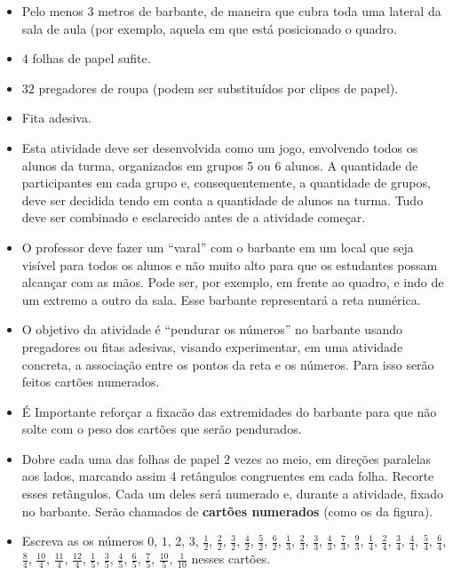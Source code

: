 \documentclass[oneside]{book}
\begin{document}
\begin{multicols}{2}
\begin{itemize} %
  \item     Pelo menos     $3$     metros de barbante, de maneira que cubra toda uma lateral da sala de aula (por exemplo, aquela em que está posicionado o quadro. 
  \item         $4$     folhas de papel sufite. 
  \item         $32$     pregadores de roupa (podem ser substituídos por clipes de papel).
  \item     Fita adesiva.
\end{itemize} %

\begin{itemize} %
  \item     Esta atividade deve ser desenvolvida como um jogo, envolvendo todos os alunos da turma, organizados em grupos  5 ou 6 alunos. A quantidade de participantes em cada grupo e, consequentemente, a quantidade de grupos, deve ser decidida tendo em conta a quantidade de alunos na turma. Tudo deve ser combinado e esclarecido antes de a atividade começar.
  \item     O professor deve fazer um  ``varal'' com o barbante em um local que seja visível para todos os alunos e não muito alto para que os estudantes possam alcançar com as mãos. Pode ser, por exemplo, em frente ao quadro, e indo de um extremo a outro da sala. Esse barbante representará a reta numérica. 
  \item O objetivo da atividade é ``pendurar os números'' no barbante usando pregadores ou fitas adesivas, visando experimentar, em uma atividade concreta, a associação entre os pontos da reta e os números. Para isso serão feitos cartões numerados. 
  \item É Importante reforçar a fixacão das extremidades do barbante para que não solte com o peso dos cartões que serão pendurados.
  \item Dobre cada uma das folhas de papel $2$ vezes ao meio, em direções paralelas aos lados, marcando assim 4 retângulos congruentes em cada folha. Recorte esses retângulos. Cada um deles será numerado e, durante a atividade, fixado no barbante. Serão chamados de {\bf cartões numerados} (como os da figura). 
  \item  Escreva as os números $0$, $1$, $2$, $3$, $\frac{1}{2}$, $\frac{2}{2}$, $\frac{3}{2}$, $\frac{4}{2}$, $\frac{5}{2}$, $\frac{6}{2}$, $\frac{1}{3}$, $\frac{2}{3}$, $\frac{3}{3}$, $\frac{4}{3}$, $\frac{7}{3}$, $\frac{9}{3}$, $\frac{1}{4}$, $\frac{2}{4}$, $\frac{3}{4}$, $\frac{4}{4}$, $\frac{5}{4}$, $\frac{6}{4}$, $\frac{8}{4}$, $\frac{10}{4}$, $\frac{11}{4}$, $\frac{12}{4}$, $\frac{1}{5}$, $\frac{3}{5}$, $\frac{4}{5}$, $\frac{6}{5}$, $\frac{7}{5}$, $\frac{10}{5}$, $\frac{1}{10}$ nesses cartões.

\end{itemize}
\end{multicols}
\end{document}
